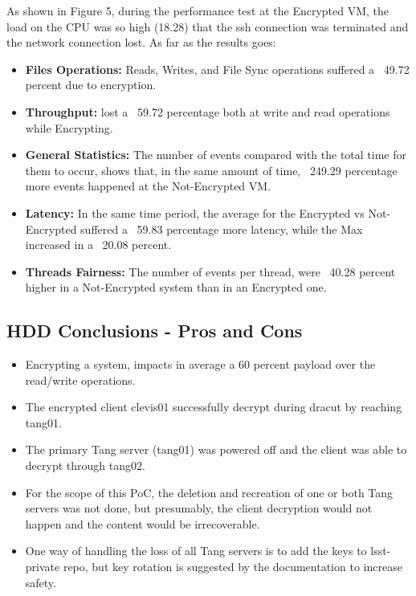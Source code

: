 As shown in Figure 5, during the performance test at the Encrypted VM, the load on the CPU was so high (18.28) that the ssh connection was terminated and the network connection lost. As far as the results goes:
\begin{itemize}
  \item \textbf{Files Operations:} Reads, Writes, and File Sync operations suffered a ~49.72 percent due to encryption.
  \item \textbf{Throughput:} lost a ~59.72 percentage both at write and read operations while Encrypting.
  \item \textbf{General Statistics:} The number of events compared with the total time for them to occur, shows that, in the same amount of time, ~249.29 percentage more events happened at the Not-Encrypted VM.
  \item \textbf{Latency:} In the same time period, the average for the Encrypted vs Not-Encrypted suffered a ~59.83 percentage more latency, while the Max increased in a ~20.08 percent.
  \item \textbf{Threads Fairness:} The number of events per thread, were ~40.28 percent higher in a Not-Encrypted system than in an Encrypted one.
\end{itemize}

\newpage
\subsection{HDD Conclusions - Pros and Cons}
\begin{itemize}
  \item Encrypting a system, impacts in average a 60 percent payload over the read/write operations.
  \item The encrypted client clevis01 successfully decrypt during dracut by reaching tang01.
  \item The primary Tang server (tang01) was powered off and the client was able to decrypt through tang02.
  \item For the scope of this PoC, the deletion and recreation of one or both Tang servers was not done, but presumably, the client decryption would not happen and the content would be irrecoverable.
  \item One way of handling the loss of all Tang servers is to add the keys to lsst-private repo, but key rotation is suggested by the documentation to increase safety.
\end{itemize}

\newpage
